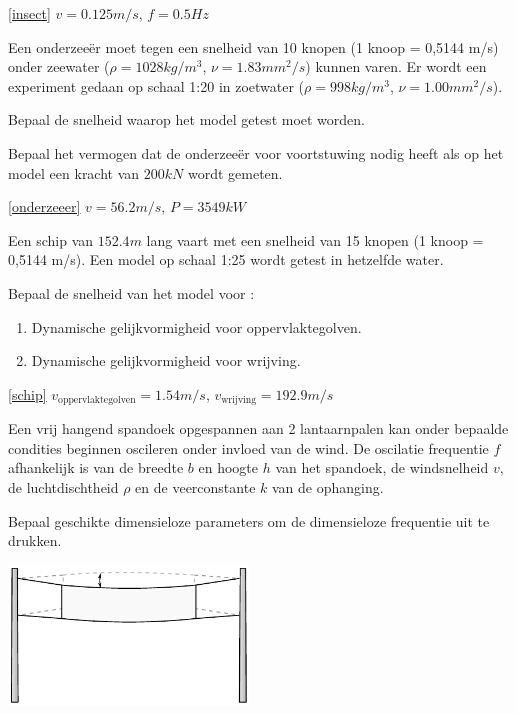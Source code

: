 \begin{antwoord}{\ref{insect}}
	$v = 0.125 \unit{m/s}$, $f = 0.5 \unit{Hz}$
\end{antwoord}
\begin{toepassing}[*]
	\label{onderzeeer}	
Een onderzeeër moet tegen een snelheid van 10 knopen (1 knoop = 0,5144 m/s) onder zeewater ($\rho = 1028 \unit{kg/m^3}$, $\nu = 1.83 \unit{mm^2/s}$) kunnen varen. Er wordt een experiment gedaan op schaal 1:20 in zoetwater ($\rho = 998 \unit{kg/m^3}$, $\nu = 1.00 \unit{mm^2/s}$).
		
Bepaal de snelheid waarop het model getest moet worden.
		
Bepaal het vermogen dat de onderzeeër voor voortstuwing nodig heeft als op het model een kracht van $200 \unit{kN}$ wordt gemeten.
\end{toepassing}
\begin{antwoord}{\ref{onderzeeer}}
	$v = 56.2 \unit{m/s}$, $P = 3549 \unit{kW}$
\end{antwoord}
\begin{toepassing}[*]
	\label{schip}
Een schip van $152.4 \unit{m}$ lang vaart met een snelheid van 15 knopen (1 knoop = 0,5144 m/s). Een model op schaal 1:25 wordt getest in hetzelfde water.

Bepaal de snelheid van het model voor :
	\begin{enumerate}
		\item Dynamische gelijkvormigheid voor oppervlaktegolven.
		\item Dynamische gelijkvormigheid voor wrijving.
	\end{enumerate}
\end{toepassing}
\begin{antwoord}{\ref{schip}}
	$v_{\text{oppervlaktegolven}} = 1.54 \unit{m/s}$, $v_{\text{wrijving}} = 192.9 \unit{m/s}$
\end{antwoord}
\begin{toepassing}
	\label{spandoek}
Een vrij hangend spandoek opgespannen aan 2 lantaarnpalen kan onder bepaalde condities beginnen oscileren onder invloed van de wind. De oscilatie frequentie $f$ afhankelijk is van de breedte $b$ en hoogte $h$ van het spandoek, de windsnelheid $v$, de luchtdischtheid $\rho$ en de veerconstante $k$ van de ophanging.

Bepaal geschikte dimensieloze parameters om de dimensieloze frequentie uit te drukken. 

	\centering
	\includegraphics[width=0.48\textwidth]{fig/gelijkvormigheid/spandoek.pdf}
\end{toepassing}

